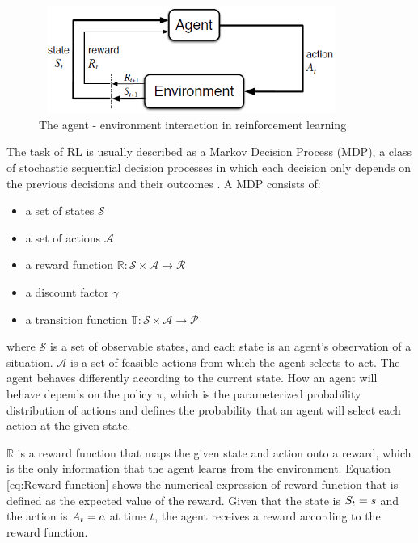 \documentclass{article}
\begin{document}
\begin{figure}[ht]
    \centering
    \includegraphics[width = 10cm, height = 3.5cm]{images/RL_Framework.PNG}
    \caption{The agent - environment interaction in reinforcement learning \cite{sutton1998introduction}}
    \label{fig:Framework}
\end{figure}

The task of RL is usually described as a Markov Decision Process (MDP), a class of stochastic sequential decision processes in which each decision only depends on the previous decisions and their outcomes \cite{sutton1998introduction, puterman1990markov}. A MDP consists of:

\begin{itemize}
    \item a set of states $\mathcal{S}$
    \item a set of actions $\mathcal{A}$
    \item a reward function $\mathbb{R}: \mathcal{S} \times \mathcal{A} \rightarrow \mathcal{R}$
    \item a discount factor $\gamma$
    \item a transition function $\mathbb{T}: \mathcal{S} \times \mathcal{A} \rightarrow \mathcal{P}$ 
\end{itemize}

\noindent where $\mathcal{S}$ is a set of observable states, and each state is an agent's observation of a situation. $\mathcal{A}$ is a set of feasible actions from which the agent selects to act. The agent behaves differently according to the current state. How an agent will behave depends on the policy $\pi$, which is the parameterized probability distribution of actions and defines the probability that an agent will select each action at the given state.

$\mathbb{R}$ is a reward function that maps the given state and action onto a reward, which is the only information that the agent learns from the environment. Equation \ref{eq:Reward function} shows the numerical expression of reward function that is defined as the expected value of the reward. Given that the state is $\mathnormal{S}_{t} = \mathnormal{s}$ and the action is $\mathnormal{A}_{t} = \mathnormal{a}$ at time $\mathnormal{t}$, the agent receives a reward according to the reward function.
\end{document}
